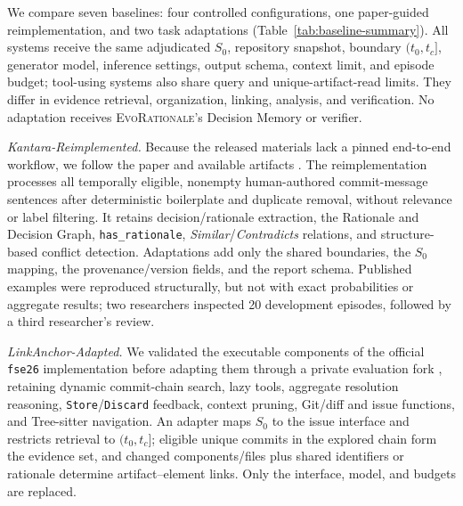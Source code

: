 \documentclass[10pt,conference]{IEEEtran}
\begin{document}
We compare seven baselines: four controlled configurations, one paper-guided reimplementation, and two task adaptations (Table~\ref{tab:baseline-summary}). All systems receive the same adjudicated $S_0$, repository snapshot, boundary $(t_0,t_c]$, generator model, inference settings, output schema, context limit, and episode budget; tool-using systems also share query and unique-artifact-read limits. They differ in evidence retrieval, organization, linking, analysis, and verification. No adaptation receives \textsc{EvoRationale}'s Decision Memory or verifier. \par\noindent\textit{Kantara-Reimplemented.} Because the released materials lack a pinned end-to-end workflow, we follow the paper and available artifacts \cite{Dhaouadi2025Kantara}. The reimplementation processes all temporally eligible, nonempty human-authored commit-message sentences after deterministic boilerplate and duplicate removal, without relevance or label filtering. It retains decision/rationale extraction, the Rationale and Decision Graph, \texttt{has\_rationale}, \emph{Similar}/\emph{Contradicts} relations, and structure-based conflict detection. Adaptations add only the shared boundaries, the $S_0$ mapping, the provenance/version fields, and the report schema. Published examples were reproduced structurally, but not with exact probabilities or aggregate results; two researchers inspected 20 development episodes, followed by a third researcher's review. \par\noindent\textit{LinkAnchor-Adapted.} We validated the executable components of the official \texttt{fse26} implementation before adapting them through a private evaluation fork \cite{Akhavan2026LinkAnchor}, retaining dynamic commit-chain search, lazy tools, aggregate resolution reasoning, \texttt{Store}/\texttt{Discard} feedback, context pruning, Git/diff and issue functions, and Tree-sitter navigation. An adapter maps $S_0$ to the issue interface and restricts retrieval to $(t_0,t_c]$; eligible unique commits in the explored chain form the evidence set, and changed components/files plus shared identifiers or rationale determine artifact--element links. Only the interface, model, and budgets are replaced.
\end{document}
